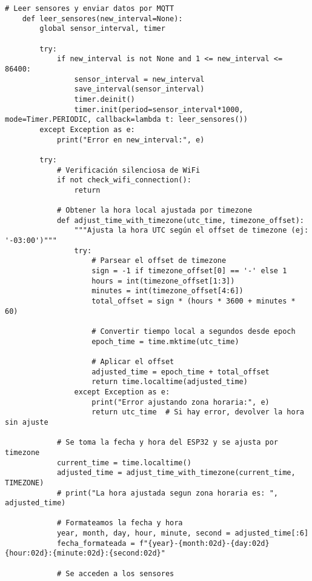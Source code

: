 \begin{lstlisting}[label=cod:firmware,caption=Firmware nodo sensor de consumos. , language=PythonUTF8]
    # Leer sensores y enviar datos por MQTT
    def leer_sensores(new_interval=None):        
        global sensor_interval, timer
        
        try:
            if new_interval is not None and 1 <= new_interval <= 86400:
                sensor_interval = new_interval
                save_interval(sensor_interval)
                timer.deinit()
                timer.init(period=sensor_interval*1000, mode=Timer.PERIODIC, callback=lambda t: leer_sensores())
        except Exception as e:
            print("Error en new_interval:", e)
    
        try:
            # Verificación silenciosa de WiFi
            if not check_wifi_connection():
                return
            
            # Obtener la hora local ajustada por timezone
            def adjust_time_with_timezone(utc_time, timezone_offset):
                """Ajusta la hora UTC según el offset de timezone (ej: '-03:00')"""
                try:
                    # Parsear el offset de timezone
                    sign = -1 if timezone_offset[0] == '-' else 1
                    hours = int(timezone_offset[1:3])
                    minutes = int(timezone_offset[4:6])
                    total_offset = sign * (hours * 3600 + minutes * 60)
                    
                    # Convertir tiempo local a segundos desde epoch
                    epoch_time = time.mktime(utc_time)
                    
                    # Aplicar el offset
                    adjusted_time = epoch_time + total_offset
                    return time.localtime(adjusted_time)
                except Exception as e:
                    print("Error ajustando zona horaria:", e)
                    return utc_time  # Si hay error, devolver la hora sin ajuste
            
            # Se toma la fecha y hora del ESP32 y se ajusta por timezone
            current_time = time.localtime()
            adjusted_time = adjust_time_with_timezone(current_time, TIMEZONE)
            # print("La hora ajustada segun zona horaria es: ", adjusted_time)
            
            # Formateamos la fecha y hora
            year, month, day, hour, minute, second = adjusted_time[:6]
            fecha_formateada = f"{year}-{month:02d}-{day:02d} {hour:02d}:{minute:02d}:{second:02d}"
            
            # Se acceden a los sensores
            

\end{lstlisting}
